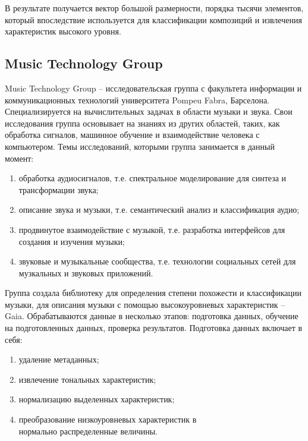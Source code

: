 В результате получается вектор большой размерности, порядка тысячи элементов, который впоследствие используется для классификации композиций и извлечения характеристик высокого уровня.

\subsection{Music Technology Group}
\label{sec:analogues:mtg}
Music Technology Group -- исследовательская группа с факультета информации и коммуникационных технологий университета Pompeu Fabra, \linebreak Барселона. Специализируется на вычислительных задачах в области музыки и звука. Свои исследования группа основывает на знаниях из других областей, таких, как обработка сигналов, машинное обучение и взаимодействие человека с компьютером. Темы исследований, которыми группа занимается в данный момент:
\begin{enumerate}
    \item обработка аудиосигналов, т.е. спектральное моделирование для \linebreak синтеза и трансформации звука;
    \item описание звука и музыки, т.е. семантический анализ и классификация аудио;
    \item продвинутое взаимодействие с музыкой, т.е. разработка интерфейсов для создания и изучения музыки;
    \item звуковые и музыкальные сообщества, т.е. технологии социальных сетей для музкальных и звуковых приложений.
\end{enumerate}

Группа создала библиотеку для определения степени похожести и \linebreak классификации музыки, для описания музыки с помощью высокоуровневых характеристик -- Gaia. Обрабатываются данные в несколько этапов: подготовка данных, обучение на подготовленных данных, проверка результатов.
Подготовка данных включает в себя:
\begin{enumerate}
  \item удаление метаданных;
  \item извлечение тональных характеристик;
  \item нормализацию выделенных характеристик;
  \item преобразование низкоуровневых характеристик в \\нормально распределенные величины.
\end{enumerate}

